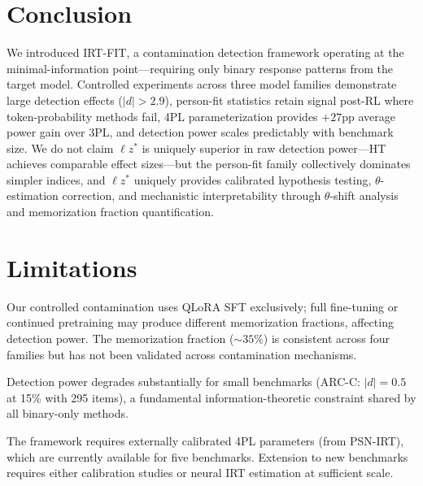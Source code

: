 \documentclass[11pt,twocolumn]{article}
\newcommand{\lzs}{\ensuremath{\ell z^*}}
\begin{document}
\section{Conclusion}

We introduced IRT-FIT, a contamination detection framework operating at the minimal-information point---requiring only binary response patterns from the target model. Controlled experiments across three model families demonstrate large detection effects ($|d| > 2.9$), person-fit statistics retain signal post-RL where token-probability methods fail, 4PL parameterization provides $+27$pp average power gain over 3PL, and detection power scales predictably with benchmark size. We do not claim $\lzs$ is uniquely superior in raw detection power---HT achieves comparable effect sizes---but the person-fit family collectively dominates simpler indices, and $\lzs$ uniquely provides calibrated hypothesis testing, $\theta$-estimation correction, and mechanistic interpretability through $\theta$-shift analysis and memorization fraction quantification.

\section*{Limitations}

Our controlled contamination uses QLoRA SFT exclusively; full fine-tuning or continued pretraining may produce different memorization fractions, affecting detection power. The memorization fraction (${\sim}35\%$) is consistent across four families but has not been validated across contamination mechanisms.

Detection power degrades substantially for small benchmarks (ARC-C: $|d| = 0.5$ at 15\% with 295 items), a fundamental information-theoretic constraint shared by all binary-only methods.

The framework requires externally calibrated 4PL parameters (from PSN-IRT), which are currently available for five benchmarks. Extension to new benchmarks requires either calibration studies or neural IRT estimation at sufficient scale.


\end{document}
